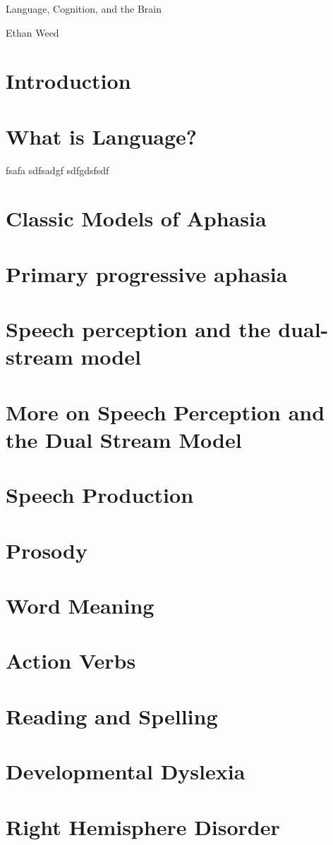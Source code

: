 \documentclass[]{article}
\author{}
\date{\vspace{-2.5em}}
\begin{document}
\frontmatter

Language, Cognition, and the Brain

Ethan Weed

{
\setcounter{tocdepth}{2}
\tableofcontents
}
\section{Introduction}\label{introduction}

\section{What is Language?}\label{what-is-language}

fsafa sdfsadgf sdfgdsfsdf

\section{Classic Models of Aphasia}\label{classic-models-of-aphasia}

\section{Primary progressive aphasia}\label{primary-progressive-aphasia}

\section{Speech perception and the dual-stream
model}\label{speech-perception-and-the-dual-stream-model}

\section{More on Speech Perception and the Dual Stream
Model}\label{more-on-speech-perception-and-the-dual-stream-model}

\section{Speech Production}\label{speech-production}

\section{Prosody}\label{prosody}

\section{Word Meaning}\label{word-meaning}

\section{Action Verbs}\label{action-verbs}

\section{Reading and Spelling}\label{reading-and-spelling}

\section{Developmental Dyslexia}\label{developmental-dyslexia}

\section{Right Hemisphere Disorder}\label{right-hemisphere-disorder}
\end{document}
